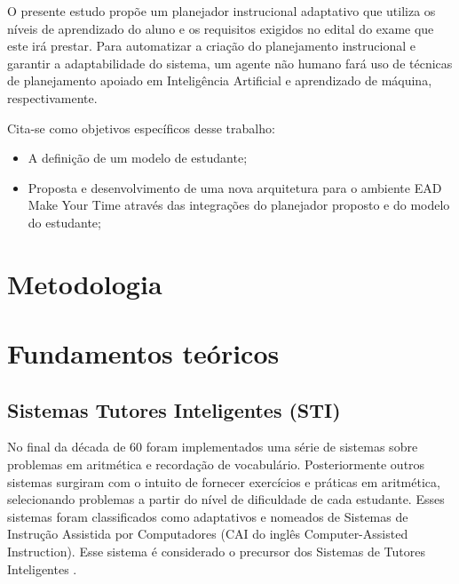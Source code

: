 \documentclass[
12pt,				%
oneside,			%
a4paper,			%
english,			%
brazil				%
]{abntex2ppgsi}
\begin{document}
O presente estudo propõe um planejador instrucional adaptativo que utiliza os níveis de aprendizado do aluno e os requisitos exigidos no edital do exame que este irá prestar. Para automatizar a criação do planejamento instrucional e garantir a adaptabilidade do sistema, um agente não humano fará uso de técnicas de planejamento apoiado em Inteligência Artificial e aprendizado de máquina, respectivamente.

Cita-se como objetivos específicos desse trabalho:
\begin{itemize}
	\item A definição de um modelo de estudante;
	\item Proposta e desenvolvimento de uma nova arquitetura para o ambiente EAD Make Your Time através das integrações do planejador proposto e do modelo do estudante;
\end{itemize}

\chapter{Metodologia}

\chapter{Fundamentos teóricos}

\section{Sistemas Tutores Inteligentes (STI)}

No final da década de 60 foram implementados uma série de sistemas sobre problemas em aritmética e recordação de vocabulário. Posteriormente outros sistemas surgiram com o intuito de fornecer exercícios e práticas em aritmética, selecionando problemas a partir do nível de dificuldade de cada estudante. Esses sistemas foram classificados como adaptativos e nomeados de Sistemas de Instrução Assistida por Computadores (CAI do inglês Computer-Assisted Instruction). Esse sistema é considerado o precursor dos Sistemas de Tutores Inteligentes \cite{sleeman1982}.
\end{document}
